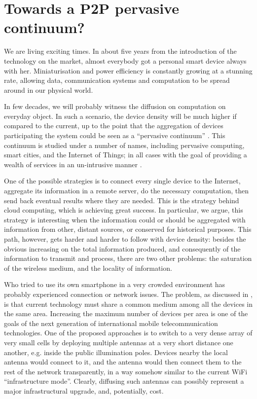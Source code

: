 \documentclass[12pt,a4paper,twoside,openright]{book}
\begin{document}
\section{Towards a P2P pervasive continuum?}

We are living exciting times.
%
In about five years from the introduction of the technology on the market, almost everybody got a personal smart device always with her.
%
Miniaturisation and power efficiency is constantly growing at a stunning rate, allowing data, communication systems and computation to be spread around in our physical world.

In few decades, we will probably witness the diffusion on computation on everyday object.
%
In such a scenario, the device density will be much higher if compared to the current, up to the point that the aggregation of devices participating the system could be seen as a ``pervasive continuum'' \cite{sapere-procedia7}.
%
This continuum is studied under a number of names, including pervasive computing, smart cities, and the Internet of Things; in all cases with the goal of providing a wealth of services in an un-intrusive manner \cite{ker2014,Conti12,zam12,Harnie12}.

One of the possible strategies is to connect every single device to the Internet, aggregate its information in a remote server, do the necessary computation, then send back eventual results where they are needed.
%
This is the strategy behind cloud computing, which is achieving great success.
%
In particular, we argue, this strategy is interesting when the information could or should be aggregated with information from other, distant sources, or conserved for historical purposes.
%
This path, however, gets harder and harder to follow with device density: besides the obvious increasing on the total information produced, and consequently of the information to transmit and process, there are two other problems: the saturation of the wireless medium, and the locality of information.

Who tried to use its own smartphone in a very crowded environment has probably experienced connection or network issues.
%
The problem, as discussed in , is that current technology must share a common medium among all the devices in the same area.
%
Increasing the maximum number of devices per area is one of the goals of the next generation of international mobile telecommunication technologies.
%
One of the proposed approaches is to switch to a very dense array of very small cells by deploying multiple antennas at a very short distance one another, e.g. inside the public illumination poles.
%
Devices nearby the local antenna would connect to it, and the antenna would then connect them to the rest of the network transparently, in a way somehow similar to the current WiFi ``infrastructure mode''.
%
Clearly, diffusing such antennas can possibly represent a major infrastructural upgrade, and, potentially, cost.
\end{document}
